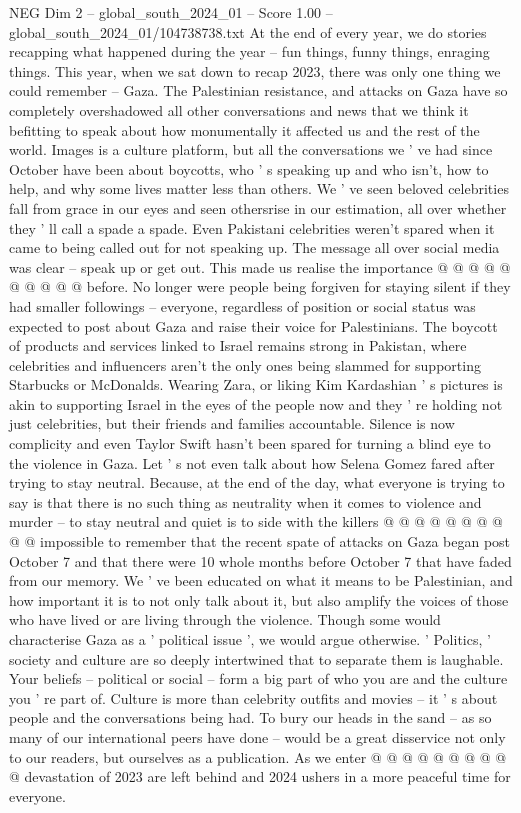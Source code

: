\begin{textsample}{NEG Dim 2 – global\_south\_2024\_01 – Score 1.00 – global\_south\_2024\_01/104738738.txt}  \label{ex:f2_neg_319}
At the end of every year, we do stories recapping what happened during the year -- fun things, funny things, enraging things.
This year, when we sat down to recap 2023, there was only one thing we could remember -- Gaza.
The Palestinian resistance, and attacks on Gaza have so completely overshadowed all other conversations and news that we think it befitting to speak about how monumentally it affected us and the rest of the world.
Images is a culture platform, but all the conversations we ' ve had since October have been about boycotts, who ' s speaking up and who isn't, how to help, and why some lives matter less than others.
We ' ve seen beloved celebrities fall from grace in our eyes and seen othersrise in our estimation, all over whether they ' ll call a spade a spade.
Even Pakistani celebrities weren't spared when it came to being called out for not speaking up.
The message all over social media was clear -- speak up or get out.
This made us realise the importance @ @ @ @ @ @ @ @ @ @ before.
No longer were people being forgiven for staying silent if they had smaller followings -- everyone, regardless of position or social status was expected to post about Gaza and raise their voice for Palestinians.
The boycott of products and services linked to Israel remains strong in Pakistan, where celebrities and influencers aren't the only ones being slammed for supporting Starbucks or McDonalds.
Wearing Zara, or liking Kim Kardashian ' s pictures is akin to supporting Israel in the eyes of the people now and they ' re holding not just celebrities, but their friends and families accountable.
Silence is now complicity and even Taylor Swift hasn't been spared for turning a blind eye to the violence in Gaza.
Let ' s not even talk about how Selena Gomez fared after trying to stay neutral.
Because, at the end of the day, what everyone is trying to say is that there is no such thing as neutrality when it comes to violence and murder -- to stay neutral and quiet is to side with the killers @ @ @ @ @ @ @ @ @ @ impossible to remember that the recent spate of attacks on Gaza began post October 7 and that there were 10 whole months before October 7 that have faded from our memory.
We ' ve been educated on what it means to be Palestinian, and how important it is to not only talk about it, but also amplify the voices of those who have lived or are living through the violence.
Though some would characterise Gaza as a ' political issue ', we would argue otherwise. ' Politics, ' society and culture are so deeply intertwined that to separate them is laughable.
Your beliefs -- political or social -- form a big part of who you are and the culture you ' re part of.
Culture is more than celebrity outfits and movies -- it ' s about people and the conversations being had.
To bury our heads in the sand -- as so many of our international peers have done -- would be a great disservice not only to our readers, but ourselves as a publication.
As we enter @ @ @ @ @ @ @ @ @ @ devastation of 2023 are left behind and 2024 ushers in a more peaceful time for everyone.

\end{textsample}
